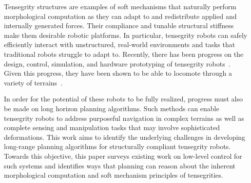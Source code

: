 Tensegrity structures are examples of soft mechanisms that naturally
perform morphological computation as they can adapt to and
redistribute applied and internally generated forces. Their compliance
and tunable structural stiffness make them desirable robotic
platforms.  In particular, tensegrity robots can safely efficiently
interact with unstructured, real-world environments and tasks that
traditional robots struggle to adapt to. Recently, there has been
progress on the design, control, simulation, and hardware prototyping
of tensegrity robots~\cite{skelton_tensegrity_2009,
Caluwaerts2013rsif}.  Given this progress, they have been shown to be
able to locomote through a variety of terrains~\cite{iscen2014flop,
MirletzSoftRobotics, Caluwaerts2013rsif}.


In order for the potential of these robots to be fully realized,
progress must also be made on long horizon planning algorithms. Such
methods can enable tensegrity robots to address purposeful navigation
in complex terrains as well as complete sensing and manipulation tasks
that may involve sophisticated deformations.  This work aims to
identify the underlying challenges in developing long-range planning
algorithms for structurally compliant tensegrity robots.  Towards this
objective, this paper surveys existing work on low-level control for
such systems and identifies ways that planning can reason about the
inherent morphological computation and soft mechanism principles of
tensegrities.



